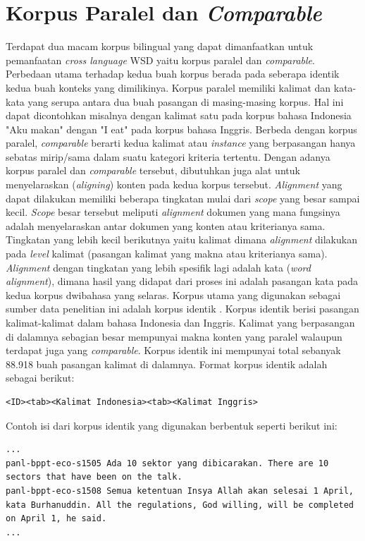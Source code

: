 \section{Korpus Paralel dan \textit{Comparable}}
Terdapat dua macam korpus bilingual yang dapat dimanfaatkan untuk pemanfaatan \textit{cross language } WSD yaitu korpus paralel dan \textit{comparable}. Perbedaan utama terhadap kedua buah korpus berada pada seberapa identik kedua buah konteks yang dimilikinya. Korpus paralel memiliki kalimat dan kata-kata yang serupa antara dua buah pasangan di masing-masing korpus. Hal ini dapat dicontohkan misalnya dengan kalimat satu pada korpus bahasa Indonesia "Aku makan" dengan "I eat" pada korpus bahasa Inggris. Berbeda dengan korpus paralel, \textit{comparable} berarti kedua kalimat atau \textit{instance} yang berpasangan hanya sebatas mirip/sama dalam suatu kategori kriteria tertentu. Dengan adanya korpus paralel dan \textit{comparable} tersebut, dibutuhkan juga alat untuk menyelaraskan (\textit{aligning}) konten pada kedua korpus tersebut. \textit{Alignment} yang dapat dilakukan memiliki beberapa tingkatan mulai dari \textit{scope} yang besar sampai kecil. \textit{Scope} besar tersebut meliputi \textit{alignment} dokumen yang mana fungsinya adalah menyelaraskan antar dokumen yang konten atau kriterianya sama. Tingkatan yang lebih kecil berikutnya yaitu kalimat dimana \textit{alignment} dilakukan pada \textit{level} kalimat (pasangan kalimat yang makna atau kriterianya sama). \textit{Alignment} dengan tingkatan yang lebih spesifik lagi adalah kata (\textit{word alignment}), dimana hasil yang didapat dari proses ini adalah pasangan kata pada kedua korpus dwibahasa yang selaras. Korpus utama yang digunakan sebagai sumber data penelitian ini adalah korpus identik \citep{larasati2012identic}. Korpus identik berisi pasangan kalimat-kalimat dalam bahasa Indonesia dan Inggris. Kalimat yang berpasangan di dalamnya sebagian besar mempunyai makna konten yang paralel walaupun terdapat juga yang \textit{comparable}. Korpus identik ini mempunyai total sebanyak 88.918 buah pasangan kalimat di dalamnya. Format korpus identik adalah sebagai berikut:
\begin{lstlisting}
<ID><tab><Kalimat Indonesia><tab><Kalimat Inggris>
\end{lstlisting}
Contoh isi dari korpus identik yang digunakan berbentuk seperti berikut ini:
\begin{lstlisting}[backgroundcolor = \color{white}]
...
panl-bppt-eco-s1505	Ada 10 sektor yang dibicarakan.	There are 10 sectors that have been on the talk.
panl-bppt-eco-s1508	Semua ketentuan Insya Allah akan selesai 1 April, kata Burhanuddin.	All the regulations, God willing, will be completed on April 1, he said.
...
\end{lstlisting}

